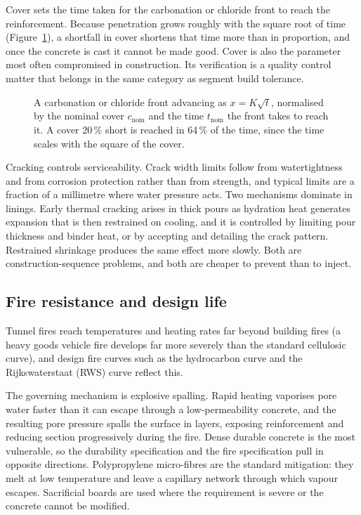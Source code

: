 Cover sets the time taken for the carbonation or chloride front to reach the
reinforcement. Because penetration grows roughly with the square root of
time (Figure~\ref{fig:carbonation-cover}), a shortfall in cover shortens that time more than in proportion, and
once the concrete is cast it cannot be made good. Cover is also the parameter
most often compromised in construction. Its verification is a quality control matter that
belongs in the same category as segment build tolerance.

\begin{figure}[htbp]
\centering
{}
\caption{A carbonation or chloride front advancing as $x = K\sqrt{t}$, normalised by the nominal cover $c_{\mathrm{nom}}$ and the time $t_{\mathrm{nom}}$ the front takes to reach it. A cover 20\,\% short is reached in 64\,\% of the time, since the time scales with the square of the cover.}
\label{fig:carbonation-cover}
\end{figure}

Cracking controls serviceability. Crack width limits follow from watertightness
and from corrosion protection rather than from strength, and typical limits are
a fraction of a millimetre where water pressure acts. Two mechanisms dominate
in linings. Early thermal cracking arises in thick pours as hydration heat
generates expansion that is then restrained on cooling, and it is controlled by
limiting pour thickness and binder heat, or by accepting and detailing the
crack pattern. Restrained shrinkage produces the same effect more slowly. Both
are construction-sequence problems, and both are cheaper to prevent than to
inject.

\subsection{Fire resistance and design life}
\label{sec:fire-design-life}

Tunnel fires reach temperatures and heating rates far beyond building fires
(a heavy goods vehicle fire develops far more severely than the standard
cellulosic curve), and design fire curves such as the hydrocarbon curve and
the Rijkswaterstaat (RWS) curve reflect this.

The governing mechanism is explosive spalling. Rapid heating vaporises pore
water faster than it can escape through a low-permeability concrete, and the
resulting pore pressure spalls the surface in layers, exposing reinforcement
and reducing section progressively during the fire. Dense durable concrete is
the most vulnerable, so the durability specification and the fire
specification pull in opposite directions. Polypropylene micro-fibres are the
standard mitigation: they melt at low temperature and leave a capillary network
through which vapour escapes. Sacrificial boards are used where the
requirement is severe or the concrete cannot be modified.

